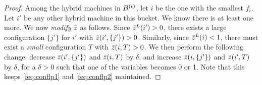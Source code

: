 \begin{proof}
Among the hybrid machines in $B^{(t)}$, let $i$  be the one with the smallest $f_i$. Let $i'$ be any other hybrid machine in this bucket. We know there is at least one more.
%	
%	
	We now \emph{modify} $\bar z$ as follows.
	Since $\bar z^L(i') > 0$, there exists a large configuration $\{j'\}$ for $i'$ with $\bar z(i',\{j'\}) > 0$. Similarly, since $\bar z^L(i) < 1$, there must exist a {\em small} configuration $T$ with $\bar z(i,T) > 0$.
	We then perform the following change: decrease $\bar z(i',\{j'\})$ and $\bar z(i,T)$ by $\delta$, and increase $\bar z(i,\{j'\})$ and $\bar z(i',T)$ by $\delta$,  for a $\delta > 0$ such that one of the variables becomes 0 or 1.
	Note that this keeps \eqref{feq:conflp1} and \eqref{feq:conflp2} maintained. 	%
	

\end{proof}
